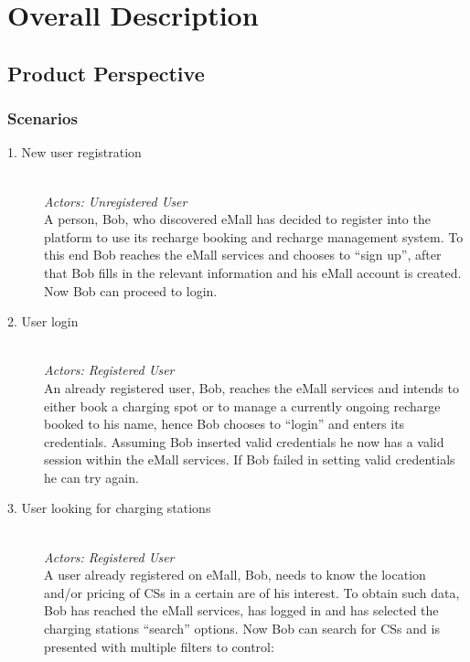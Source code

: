 \documentclass[11pt]{article}
\begin{document}
\section{Overall Description}
\label{section:overallDescription}

\subsection{Product Perspective}

\subsubsection{Scenarios}
\label{subsubsec:scenarios}

\begin{description}
    \item [1. New user registration] \hfill \\
        \textit{Actors: Unregistered User} \\
        A person, Bob, who discovered eMall has decided to register into the platform to use its recharge booking and recharge management system. To this end Bob reaches the eMall services and chooses to “sign up”, after that Bob fills in the relevant information and his eMall account is created. Now Bob can proceed to login.
    \item [2. User login] \hfill \\
        \textit{Actors: Registered User} \\
        An already registered user, Bob, reaches the eMall services and intends to either book a charging spot or to manage a currently ongoing recharge booked to his name, hence Bob chooses to “login” and enters its credentials. Assuming Bob inserted valid credentials he now has a valid session within the eMall services. If Bob failed in setting valid credentials he can try again.
    \item [3. User looking for charging stations] \hfill \\
        \label{scenario:lookingForCS}
        \textit{Actors: Registered User} \\
        A user already registered on eMall, Bob, needs to know the location and/or pricing of CSs in a certain are of his interest. To obtain such data, Bob has reached the eMall services, has logged in and has selected the charging stations “search” options. Now Bob can search for CSs and is presented with multiple filters to control:
        \begin{itemize}

\end{itemize}
\end{description}
\end{document}
